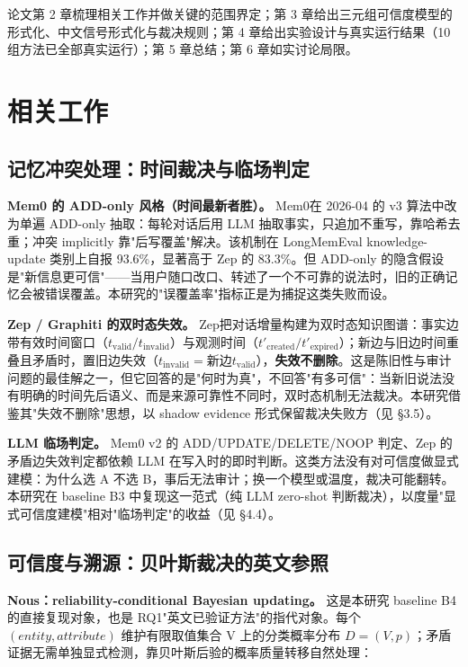 \documentclass{article}
\begin{document}
论文第 2 章梳理相关工作并做关键的范围界定；第 3 章给出三元组可信度模型的形式化、中文信号形式化与裁决规则；第 4 章给出实验设计与真实运行结果（10 组方法已全部真实运行）；第 5 章总结；第 6 章如实讨论局限。


\section{相关工作}

\subsection{记忆冲突处理：时间裁决与临场判定}

\textbf{Mem0 的 ADD-only 风格（时间最新者胜）。} Mem0\citep{chhikara2025}在 2026-04 的 v3 算法中改为单遍 ADD-only 抽取：每轮对话后用 LLM 抽取事实，只追加不重写，靠哈希去重；冲突 implicitly 靠"后写覆盖"解决。该机制在 LongMemEval knowledge-update 类别上自报 93.6\%，显著高于 Zep 的 83.3\%。但 ADD-only 的隐含假设是"新信息更可信"——当用户随口改口、转述了一个不可靠的说法时，旧的正确记忆会被错误覆盖。本研究的"误覆盖率"指标正是为捕捉这类失败而设。


\textbf{Zep / Graphiti 的双时态失效。} Zep\citep{rasmussen2025}把对话增量构建为双时态知识图谱：事实边带有效时间窗口（$t_{\mathrm{valid}}/t_{\mathrm{invalid}}$）与观测时间（$t'_{\mathrm{created}}/t'_{\mathrm{expired}}$）；新边与旧边时间重叠且矛盾时，置旧边失效（$t_{\mathrm{invalid}}=$新边$t_{\mathrm{valid}}$），\textbf{失效不删除}。这是陈旧性与审计问题的最佳解之一，但它回答的是"何时为真"，不回答"有多可信"：当新旧说法没有明确的时间先后语义、而是来源可靠性不同时，双时态机制无法裁决。本研究借鉴其"失效不删除"思想，以 shadow evidence 形式保留裁决失败方（见 §3.5）。


\textbf{LLM 临场判定。} Mem0 v2 的 ADD/UPDATE/DELETE/NOOP 判定、Zep 的矛盾边失效判定都依赖 LLM 在写入时的即时判断。这类方法没有对可信度做显式建模：为什么选 A 不选 B，事后无法审计；换一个模型或温度，裁决可能翻转。本研究在 baseline B3 中复现这一范式（纯 LLM zero-shot 判断裁决），以度量"显式可信度建模"相对"临场判定"的收益（见 §4.4）。


\subsection{可信度与溯源：贝叶斯裁决的英文参照}

\textbf{Nous：reliability-conditional Bayesian updating\citep{singh2026}。} 这是本研究 baseline B4 的直接复现对象，也是 RQ1"英文已验证方法"的指代对象。每个 $(entity, attribute)$ 维护有限取值集合 V 上的分类概率分布 $D=(V, p)$；矛盾证据无需单独显式检测，靠贝叶斯后验的概率质量转移自然处理：
\end{document}
